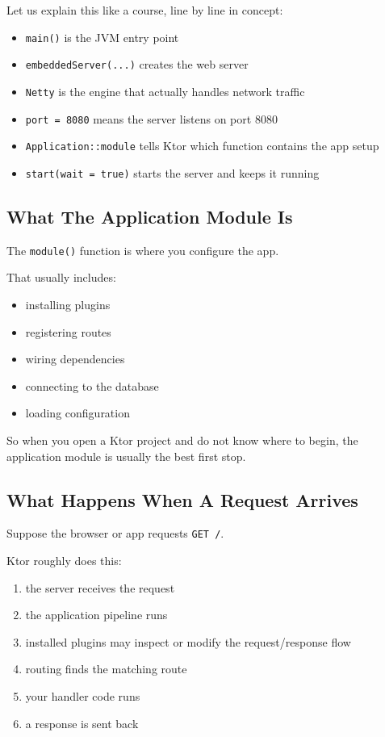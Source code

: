 \documentclass[11pt,a4paper]{article}
\begin{document}
Let us explain this like a course, line by line in concept:
\begin{itemize}
    \item \texttt{main()} is the JVM entry point
    \item \texttt{embeddedServer(...)} creates the web server
    \item \texttt{Netty} is the engine that actually handles network traffic
    \item \texttt{port = 8080} means the server listens on port 8080
    \item \texttt{Application::module} tells Ktor which function contains the app setup
    \item \texttt{start(wait = true)} starts the server and keeps it running
\end{itemize}

\subsection{What The Application Module Is}

The \texttt{module()} function is where you configure the app.

That usually includes:
\begin{itemize}
    \item installing plugins
    \item registering routes
    \item wiring dependencies
    \item connecting to the database
    \item loading configuration
\end{itemize}

So when you open a Ktor project and do not know where to begin, the application module is usually the best first stop.

\subsection{What Happens When A Request Arrives}

Suppose the browser or app requests \texttt{GET /}.

Ktor roughly does this:
\begin{enumerate}
    \item the server receives the request
    \item the application pipeline runs
    \item installed plugins may inspect or modify the request/response flow
    \item routing finds the matching route
    \item your handler code runs
    \item a response is sent back
\end{enumerate}
\end{document}
